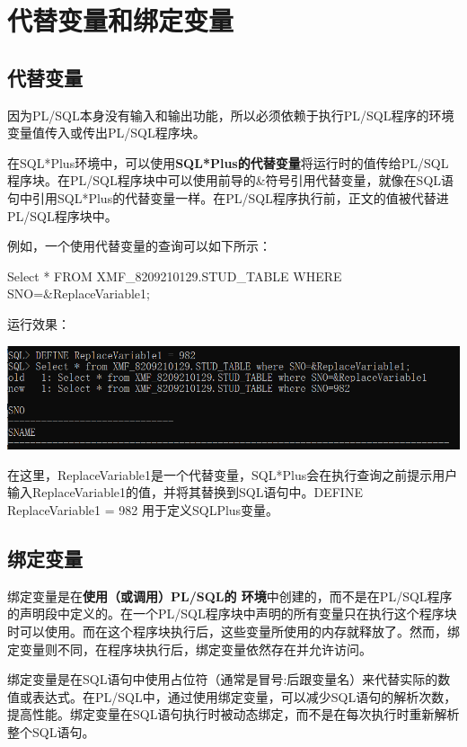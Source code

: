 \documentclass[11pt, a4paper, oneside, UTF8]{ctexbook}
\let\kaishu\relax %
\begin{document}
\section{代替变量和绑定变量}
\subsection{代替变量}
因为PL/SQL本身没有输入和输出功能，所以必须依赖于执行PL/SQL程序的环境变量值传入或传出PL/SQL程序块。

在SQL*Plus环境中，可以使用{\bfseries\kaishu SQL*Plus的代替变量}将运行时的值传给PL/SQL程序块。在PL/SQL程序块中可以使用前导的\&符号引用代替变量，就像在SQL语句中引用SQL*Plus的代替变量一样。在PL/SQL程序执行前，正文的值被代替进PL/SQL程序块中。

例如，一个使用代替变量的查询可以如下所示：
\begin{plsql}[]
Select * 
FROM XMF_8209210129.STUD_TABLE 
WHERE SNO=&ReplaceVariable1;
\end{plsql}

运行效果：
\begin{center}
  \begin{minipage}{\textwidth}
    \center
    \includegraphics[width=\textwidth]{picture/代替变量案例.png}
    \captionsetup{hypcap=false}
    \label{fig:代替变量案例}
  \end{minipage}
\end{center}


在这里，ReplaceVariable1是一个代替变量，SQL*Plus会在执行查询之前提示用户输入ReplaceVariable1的值，并将其替换到SQL语句中。DEFINE ReplaceVariable1 = 982 用于定义SQLPlus变量。
\subsection{绑定变量}
绑定变量是在{\bfseries\kaishu 使用（或调用）PL/SQL的 环境}中创建的，而不是在PL/SQL程序的声明段中定义的。在一个PL/SQL程序块中声明的所有变量只在执行这个程序块时可以使用。而在这个程序块执行后，这些变量所使用的内存就释放了。然而，绑定变量则不同，在程序块执行后，绑定变量依然存在并允许访问。

绑定变量是在SQL语句中使用占位符（通常是冒号:后跟变量名）来代替实际的数值或表达式。在PL/SQL中，通过使用绑定变量，可以减少SQL语句的解析次数，提高性能。绑定变量在SQL语句执行时被动态绑定，而不是在每次执行时重新解析整个SQL语句。
\end{document}
